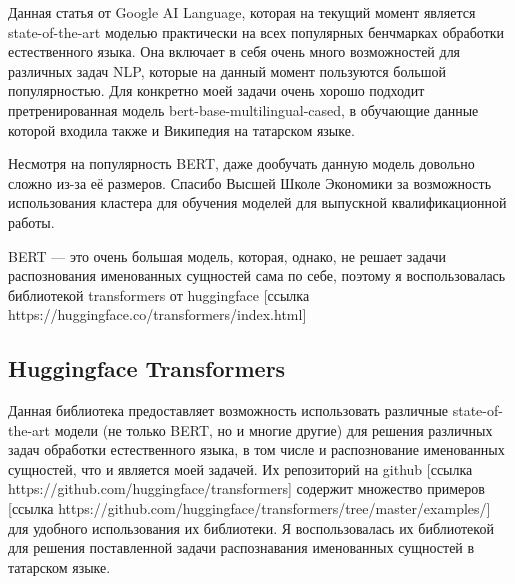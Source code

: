 Данная статья от Google AI Language, которая на текущий момент является state-of-the-art моделью практически на всех популярных бенчмарках обработки естественного языка. Она включает в себя очень много возможностей для различных задач NLP, которые на данный момент пользуются большой популярностью. Для конкретно моей задачи очень хорошо подходит претренированная модель bert-base-multilingual-cased, в обучающие данные которой входила также и Википедия на татарском языке.

Несмотря на популярность BERT, даже дообучать данную модель довольно сложно из-за её размеров. Спасибо Высшей Школе Экономики за возможность использования кластера для обучения моделей для выпускной квалификационной работы.

BERT --- это очень большая модель, которая, однако, не решает задачи распознования именованных сущностей сама по себе, поэтому я воспользовалась библиотекой transformers от huggingface [ссылка https://huggingface.co/transformers/index.html]

\subsection{Huggingface Transformers}

Данная библиотека предоставляет возможность использовать различные state-of-the-art модели (не только BERT, но и многие другие) для решения различных задач обработки естественного языка, в том числе и распознование именованных сущностей, что и является моей задачей.
Их репозиторий на github [ссылка https://github.com/huggingface/transformers] содержит множество примеров [ссылка https://github.com/huggingface/transformers/tree/master/examples/] для удобного использования их библиотеки. Я воспользовалась их библиотекой для решения поставленной задачи распознавания именованных сущностей в татарском языке.






